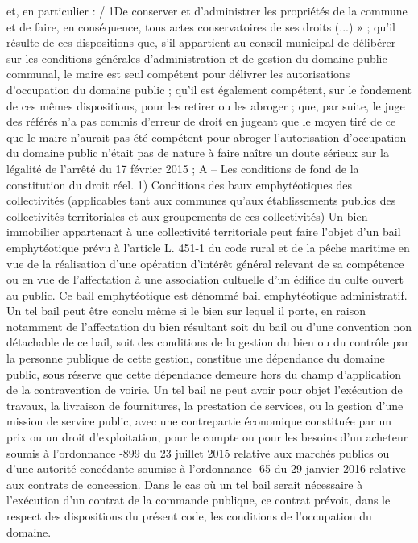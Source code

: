 \documentclass[11pt,a4paper]{report}
\begin{document}
et, en particulier : / 1\degre  De conserver et d’administrer les propriétés de la commune et de faire, en conséquence,
tous actes conservatoires de ses droits (...) » ; qu’il résulte de ces dispositions que, s’il appartient au conseil
municipal de délibérer sur les conditions générales d’administration et de gestion du domaine public communal,
le maire est seul compétent pour délivrer les autorisations d’occupation du domaine public ; qu’il est également
compétent, sur le fondement de ces mêmes dispositions, pour les retirer ou les abroger ; que, par suite, le juge
des référés n’a pas commis d’erreur de droit en jugeant que le moyen tiré de ce que le maire n’aurait pas été
compétent pour abroger l’autorisation d’occupation du domaine public n’était pas de nature à faire naître un
doute sérieux sur la légalité de l’arrêté du 17 février 2015 ;
A – Les conditions de fond de la constitution du droit réel.
1\degre ) Conditions des baux emphytéotiques des collectivités (applicables tant aux communes qu’aux
établissements publics des collectivités territoriales et aux groupements de ces collectivités)
Un bien immobilier appartenant à une collectivité territoriale peut faire l'objet d'un bail emphytéotique prévu à
l'article L. 451-1 du code rural et de la pêche maritime en vue de la réalisation d'une opération d'intérêt général
relevant de sa compétence ou en vue de l'affectation à une association cultuelle d'un édifice du culte ouvert au
public. Ce bail emphytéotique est dénommé bail emphytéotique administratif.
Un tel bail peut être conclu même si le bien sur lequel il porte, en raison notamment de l'affectation du bien
résultant soit du bail ou d'une convention non détachable de ce bail, soit des conditions de la gestion du bien ou
du contrôle par la personne publique de cette gestion, constitue une dépendance du domaine public, sous
réserve que cette dépendance demeure hors du champ d'application de la contravention de voirie.
Un tel bail ne peut avoir pour objet l'exécution de travaux, la livraison de fournitures, la prestation de services,
ou la gestion d'une mission de service public, avec une contrepartie économique constituée par un prix ou un
droit d'exploitation, pour le compte ou pour les besoins d'un acheteur soumis à l'ordonnance -899 du 23
juillet 2015 relative aux marchés publics ou d'une autorité concédante soumise à l'ordonnance -65 du 29
janvier 2016 relative aux contrats de concession.
Dans le cas où un tel bail serait nécessaire à l'exécution d'un contrat de la commande publique, ce contrat
prévoit, dans le respect des dispositions du présent code, les conditions de l'occupation du domaine.
\end{document}
